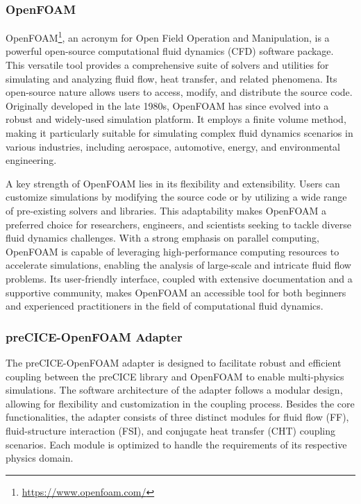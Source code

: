\subsubsection{OpenFOAM}

OpenFOAM\footnote{\url{https://www.openfoam.com/}}, an acronym for Open Field Operation and Manipulation, is a powerful open-source computational fluid dynamics (CFD) software package. This versatile tool provides a comprehensive suite of solvers and utilities for simulating and analyzing fluid flow, heat transfer, and related phenomena. Its open-source nature allows users to access, modify, and distribute the source code. Originally developed in the late 1980s, OpenFOAM has since evolved into a robust and widely-used simulation platform. It employs a finite volume method, making it particularly suitable for simulating complex fluid dynamics scenarios in various industries, including aerospace, automotive, energy, and environmental engineering.

A key strength of OpenFOAM lies in its flexibility and extensibility. Users can customize simulations by modifying the source code or by utilizing a wide range of pre-existing solvers and libraries. This adaptability makes OpenFOAM a preferred choice for researchers, engineers, and scientists seeking to tackle diverse fluid dynamics challenges. With a strong emphasis on parallel computing, OpenFOAM is capable of leveraging high-performance computing resources to accelerate simulations, enabling the analysis of large-scale and intricate fluid flow problems. Its user-friendly interface, coupled with extensive documentation and a supportive community, makes OpenFOAM an accessible tool for both beginners and experienced practitioners in the field of computational fluid dynamics.

\subsubsection{preCICE-OpenFOAM Adapter}

The preCICE-OpenFOAM adapter \cite{Chourdakis:2023} is designed to facilitate robust and efficient coupling between the preCICE library and OpenFOAM to enable multi-physics simulations. The software architecture of the adapter follows a modular design, allowing for flexibility and customization in the coupling process. Besides the core functionalities, the adapter consists of three distinct modules for fluid flow (FF), fluid-structure interaction (FSI), and conjugate heat transfer (CHT) coupling scenarios. Each module is optimized to handle the requirements of its respective physics domain.

